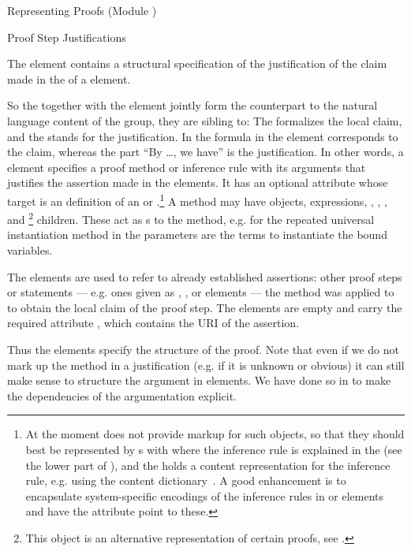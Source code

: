\begin{omgroup}[id=proofs,short=Representing Proofs]{Representing Proofs (Module {})}
\begin{module}[id=justifications]
\begin{omgroup}[id=proofs.justifications]{Proof Step Justifications}
\begin{definition}[id=method.def]
  The {} element contains a structural specification of the justification of
  the claim made in the  of a  element.
\end{definition}
So the  together with the  element jointly form the
counterpart to the natural language content of the  group, they are sibling
to: The  formalizes the local claim, and the  stands for
the justification. In {} the formula in the  element
corresponds to the claim, whereas the part ``By \ldots, we have'' is the justification. In
other words, a  element specifies a proof method or inference rule with
its arguments that justifies the assertion made in the  elements.  It has
an optional  attribute whose target is an \omdoc definition of
an {} or {}.\footnote{At the moment
  \omdoc does not provide markup for such objects, so that they should best be
  represented by s with  where the inference rule
  is explained in the  (see the lower part of {}), and the
   holds a content representation for the inference rule, e.g.  using the
  content dictionary~\cite{CD:inference-rules}.  A good enhancement is to encapsulate
  system-specific encodings of the inference rules in  or
   elements and have the  attribute point to
  these.} A method may have {\openmath} objects, {\cmathml} expressions,
, , , and
\footnote{This object is an alternative representation of certain
  proofs, see {}.} children.  These act as {}s to
the method, e.g. for the repeated universal instantiation method in {}
the parameters are the terms to instantiate the bound variables.
  
\begin{definition}[id=premise.def]
  The {} elements are used to refer to already established assertions:
  other proof steps or statements --- e.g. ones given as ,
  , or  elements --- the method was applied to to
  obtain the local claim of the proof step. The  elements are empty and
  carry the required attribute , which contains the URI of the
  assertion.
\end{definition}
Thus the  elements specify the {} structure of the
proof. Note that even if we do not mark up the method in a justification (e.g. if it is
unknown or obvious) it can still make sense to structure the argument in
 elements. We have done so in {} to make
the dependencies of the argumentation explicit.
  

\end{omgroup}
\end{module}
\end{omgroup}
